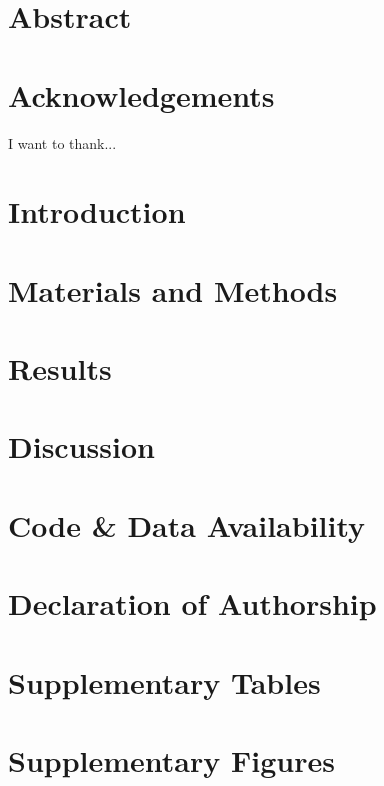 \documentclass[12pt, oneside]{report}
\begin{document}


\chapter*{Abstract}


\chapter*{Acknowledgements}
I want to thank...

\tableofcontents
\listoffigures
\listoftables
\chapter{Introduction}
\label{chapter01}


\chapter{Materials and Methods}
\label{chapter02}


\chapter{Results}
\label{chapter03}


\chapter{Discussion}
\label{discussion}


\chapter*{Code \& Data Availability}

\chapter*{Declaration of Authorship}


\appendix
\chapter{Supplementary Tables}

\chapter{Supplementary Figures}


\printbibliography
\end{document}
